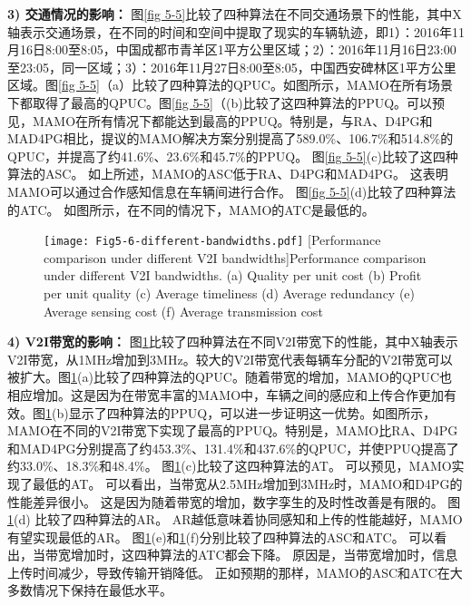 \textbf{3) 交通情况的影响：}
图\ref{fig 5-5}比较了四种算法在不同交通场景下的性能，其中X轴表示交通场景，在不同的时间和空间中提取了现实的车辆轨迹，即1）：2016年11月16日8:00至8:05，中国成都市青羊区1平方公里区域；2）：2016年11月16日23:00至23:05，同一区域；3）：2016年11月27日8:00至8:05，中国西安碑林区1平方公里区域。图\ref{fig 5-5}（a）比较了四种算法的QPUC。如图所示，MAMO在所有场景下都取得了最高的QPUC。图\ref{fig 5-5}（(b)比较了这四种算法的PPUQ。可以预见，MAMO在所有情况下都能达到最高的PPUQ。特别是，与RA、D4PG和MAD4PG相比，提议的MAMO解决方案分别提高了589.0\%、106.7\%和514.8\%的QPUC，并提高了约41.6\%、23.6\%和45.7\%的PPUQ。
图\ref{fig 5-5}(c)比较了这四种算法的ASC。
如上所述，MAMO的ASC低于RA、D4PG和MAD4PG。
这表明MAMO可以通过合作感知信息在车辆间进行合作。
图\ref{fig 5-5}(d)比较了四种算法的ATC。
如图所示，在不同的情况下，MAMO的ATC是最低的。

\begin{figure}[h]
 \centering
 \texttt{[image: Fig5-6-different-bandwidths.pdf]}
 [Performance comparison under different V2I bandwidths]{Performance comparison under different V2I bandwidths. (a) Quality per unit cost (b) Profit per unit quality (c) Average timeliness (d) Average redundancy (e) Average sensing cost (f) Average transmission cost}
 \label{fig 5-6}
\end{figure}

\textbf{4) V2I带宽的影响：}
图\ref{fig 5-6}比较了四种算法在不同V2I带宽下的性能，其中X轴表示V2I带宽，从1MHz增加到3MHz。较大的V2I带宽代表每辆车分配的V2I带宽可以被扩大。图\ref{fig 5-6}(a)比较了四种算法的QPUC。随着带宽的增加，MAMO的QPUC也相应增加。这是因为在带宽丰富的MAMO中，车辆之间的感应和上传合作更加有效。图\ref{fig 5-6}(b)显示了四种算法的PPUQ，可以进一步证明这一优势。如图所示，MAMO在不同的V2I带宽下实现了最高的PPUQ。特别是，MAMO比RA、D4PG和MAD4PG分别提高了约453.3\%、131.4\%和437.6\%的QPUC，并使PPUQ提高了约33.0\%、18.3\%和48.4\%。
图\ref{fig 5-6}(c)比较了这四种算法的AT。
可以预见，MAMO实现了最低的AT。
可以看出，当带宽从2.5MHz增加到3MHz时，MAMO和D4PG的性能差异很小。
这是因为随着带宽的增加，数字孪生的及时性改善是有限的。
图\ref{fig 5-6}(d) 比较了四种算法的AR。
AR越低意味着协同感知和上传的性能越好，MAMO有望实现最低的AR。
图\ref{fig 5-6}(e)和\ref{fig 5-6}(f)分别比较了四种算法的ASC和ATC。
可以看出，当带宽增加时，这四种算法的ATC都会下降。
原因是，当带宽增加时，信息上传时间减少，导致传输开销降低。
正如预期的那样，MAMO的ASC和ATC在大多数情况下保持在最低水平。

